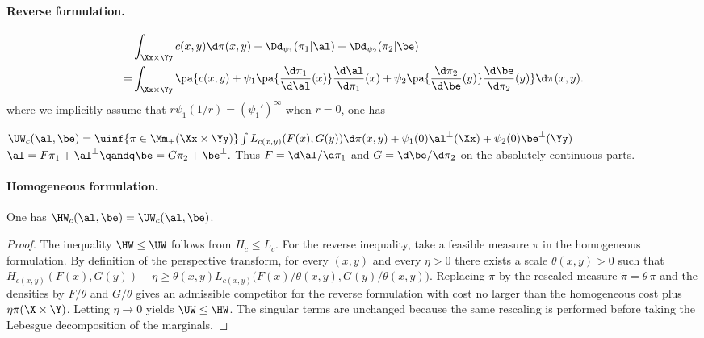 \paragraph{Reverse formulation.}
\begin{align*}
& \int_{\Xx \times \Yy} c(x,y) \d\pi(x,y)
+ \Dd_{\psi_1}(\pi_1|\al) + \Dd_{\psi_2}(\pi_2|\be) \\
=&
\int_{\Xx \times \Yy} \pa{ c(x,y) +
\psi_1\pa{ \frac{\d\pi_1}{\d\al}(x) } \frac{\d\al}{\d\pi_1}(x) +
\psi_2\pa{ \frac{\d\pi_2}{\d\be}(y) } \frac{\d\be}{\d\pi_2}(y)
} \d\pi(x,y).
\end{align*}
where we implicitly assume that $r\psi_1(1/r) = (\psi_1')^\infty$ when $r=0$, one has

\(\UW_c(\al,\be) = \uinf{\pi \in \Mm_+(\Xx \times \Yy)} \int L_{c(x,y)}( F(x),G(y) ) \d\pi(x,y) + \psi_1(0) \al^\bot(\Xx) + \psi_2(0) \be^\bot(\Yy)\)
\(\al = F \pi_1 + \al^\bot \qandq \be = G \pi_2 + \be^\bot.\)
Thus $F=\d\al/\d\pi_1$ and $G=\d\be/\d\pi_2$ on the absolutely continuous parts.

\paragraph{Homogeneous formulation.}
\begin{prop}
One has $\HW_c(\al,\be)=\UW_c(\al,\be)$.
\end{prop}
\begin{proof}
The inequality $\HW\leq\UW$ follows from $H_c\leq L_c$. For the reverse inequality, take a feasible measure $\pi$ in the homogeneous formulation. By definition of the perspective transform, for every $(x,y)$ and every $\eta>0$ there exists a scale $\theta(x,y)>0$ such that
\(H_{c(x,y)}(F(x),G(y))+\eta \geq \theta(x,y)L_{c(x,y)}\big(F(x)/\theta(x,y),G(y)/\theta(x,y)\big).\)
Replacing $\pi$ by the rescaled measure $\tilde\pi=\theta\,\pi$ and the densities by $F/\theta$ and $G/\theta$ gives an admissible competitor for the reverse formulation with cost no larger than the homogeneous cost plus $\eta\pi(\X\times\Y)$. Letting $\eta\to0$ yields $\UW\leq\HW$. The singular terms are unchanged because the same rescaling is performed before taking the Lebesgue decomposition of the marginals.
\end{proof}
